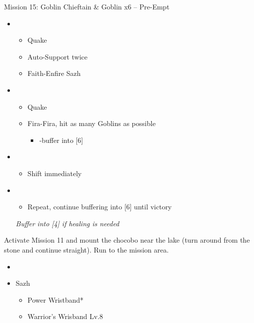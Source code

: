\begin{battle}{Mission 15: Goblin Chieftain \& Goblin x6 -- Pre-Empt}
	\begin{itemize}
		\item \third
			\begin{itemize}
				\item Quake
				\item Auto-Support twice
				\item Faith-Enfire Sazh
			\end{itemize}
		\item \second
			\begin{itemize}
				\item Quake
				\item Fira-Fira, hit as many Goblins as possible
					\begin{itemize}
						\item \com-buffer into [6]
					\end{itemize}
			\end{itemize}
		\item \sixth
			\begin{itemize}
				\item Shift immediately
			\end{itemize}
		\item \second
			\begin{itemize}
				\item Repeat, continue buffering into [6] until victory
			\end{itemize}
		\textit{Buffer into [4] if healing is needed}
	\end{itemize}
\end{battle}

Activate Mission 11 and mount the chocobo near the lake (turn around from the stone and continue straight).
Run to the mission area.

\begin{menu}
	\begin{itemize}
		\paradigm
		\begin{itemize}
			\item {}%
				  {\paradigmline{\syn}{\sab}{\com}}%
			      {\paradigmline{\rav}{\sab}{\sen}}%
			      {\paradigmline{\syn}{\med}{(\com)}}%
			      {\paradigmline[4]{\com}{\med}{(\com)}}%
			      {\paradigmline{\com}{\rav}{\com}}%
			      {\paradigmline{\com}{\sab}{\sen}}
		\end{itemize}
		\equip
		\begin{itemize}
			\item Sazh
				\begin{itemize}
					\item Power Wristband*
					\item Warrior's Wrisband Lv.8
				\end{itemize}
		\end{itemize}
	\end{itemize}
\end{menu}

